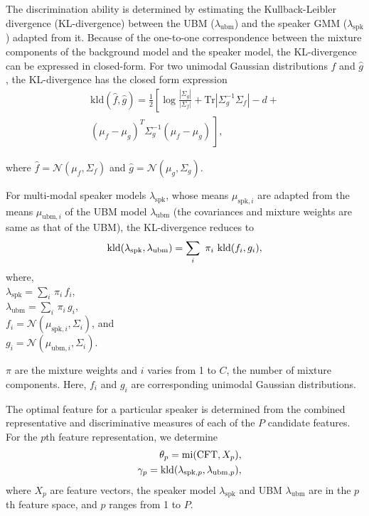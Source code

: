 \documentclass[preprint,12pt,5p]{elsarticle}
\begin{document}
The discrimination ability is determined by estimating the Kullback-Leibler divergence
(KL-divergence) between the UBM ($\lambda_{\textrm{ubm}}$) and the speaker GMM ($\lambda_{\textrm{spk}}$)
adapted from it. Because of the one-to-one
correspondence between the mixture components of the background model and the speaker model, 
the KL-divergence can be expressed in closed-form. For two unimodal Gaussian distributions
$\hat{f}$ and $\hat{g}$, the KL-divergence has the closed form expression
\begin{equation}
\begin{split}
\textrm{kld}(\hat{f},\hat{g}) = \frac{1}{2}\left[ \log \frac{|\Sigma_g|}{|\Sigma_f|} +
	\textrm{Tr}|\Sigma^{-1}_g\Sigma_f| - d + \right. \\ 
\left. (\mu_f-\mu_g)^T\Sigma_g^{-1}(\mu_f-\mu_g) \frac{}{} \right], 
\end{split}
\label{eq:kldGaussians}
\end{equation}

where $\hat{f} = \mathcal{N}(\mu_f,\Sigma_f)$ and $\hat{g} = \mathcal{N}(\mu_g,\Sigma_g)$.

For multi-modal speaker models $\lambda_{\textrm{spk}}$, whose means
$\mu_{\textrm{spk},i}$ are adapted from the means $\mu_{\textrm{ubm},i}$ of the UBM
model $\lambda_{\textrm{ubm}}$ (the covariances and mixture weights are same as
that of the UBM), the KL-divergence reduces to 
\begin{equation}
\textrm{kld}(\lambda_{\textrm{spk}},\lambda_{\textrm{ubm}}) = 
	\displaystyle \sum_i\ \pi_i\ \textrm{kld}(f_i,g_i),
\label{eq:gmmAdaptedKLD}
\vspace{-5mm}
\end{equation}
where, \\
$\lambda_{\textrm{spk}} = \displaystyle \sum_i \, \pi_i \, f_i$, \\
$\lambda_{\textrm{ubm}} = \displaystyle\sum_i \, \pi_i \, g_i$, \\
$f_i = \mathcal{N}(\mu_{\textrm{spk},i},\Sigma_i)$, and \\
$g_i = \mathcal{N}(\mu_{\textrm{ubm},i},\Sigma_i)$.

\noindent $\pi$ are the mixture weights and
$i$ varies from 1 to $C$, the number of mixture components. Here, $f_i$ and $g_i$ are
corresponding unimodal Gaussian distributions.


The optimal feature for a particular speaker is determined from the combined
representative and discriminative measures of each of the $P$ candidate
features. For the $p$th feature representation, we determine
\begin{eqnarray*}
\vspace{-3mm}
&& \theta_p = \textrm{mi}(\textrm{CFT},X_{p}), \\
&& \gamma_p =
\textrm{kld}(\lambda_{\textrm{spk},p},\lambda_{\textrm{ubm},p}),
\end{eqnarray*}
where $X_p$ are feature vectors, the speaker model $\lambda_{\textrm{spk}}$ and 
UBM $\lambda_{\textrm{ubm}}$ are in the $p$th feature space, and $p$ ranges from 1 to $P$.
\end{document}

